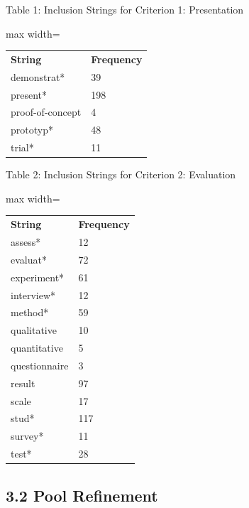 \documentclass[sigconf]{nimeart}
\begin{document}
Table 1: Inclusion Strings for Criterion 1: Presentation

{\def\LTcaptype{none} %
\begin{table}[htbp]\centering\small
\begin{adjustbox}{max width=\columnwidth}\begin{tabular}{ll}
\toprule\noalign{}
\midrule
\textbf{String} & \textbf{Frequency} \\
demonstrat* & 39 \\
present* & 198 \\
proof-of-concept & 4 \\
prototyp* & 48 \\
trial* & 11 \\
\bottomrule
\end{tabular}\end{adjustbox}\end{table}
}

Table 2: Inclusion Strings for Criterion 2: Evaluation

{\def\LTcaptype{none} %
\begin{table}[htbp]\centering\small
\begin{adjustbox}{max width=\columnwidth}\begin{tabular}{ll}
\toprule\noalign{}
\midrule
\textbf{String} & \textbf{Frequency} \\
assess* & 12 \\
evaluat* & 72 \\
experiment* & 61 \\
interview* & 12 \\
method* & 59 \\
qualitative & 10 \\
quantitative & 5 \\
questionnaire & 3 \\
result & 97 \\
scale & 17 \\
stud* & 117 \\
survey* & 11 \\
test* & 28 \\
\bottomrule
\end{tabular}\end{adjustbox}\end{table}
}

\subsection{3.2 Pool Refinement}\label{pool-refinement}
\end{document}
